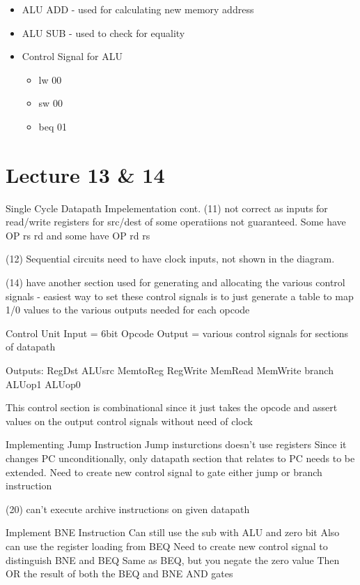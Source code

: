 \documentclass{article}
\begin{document}
		\begin{itemize}
			\item ALU ADD - used for calculating new memory address
			\item ALU SUB - used to check for equality
			\item Control Signal for ALU
			\begin{itemize}
				\item lw 00
				\item sw 00
				\item beq 01
			\end{itemize}
		\end{itemize}
		
\section{Lecture 13 \& 14}
	Single Cycle Datapath Impelementation cont.
		(11) not correct as inputs for read/write registers for src/dest of some operatiions not guaranteed. Some have OP rs rd and some have OP rd rs

		(12) Sequential circuits need to have clock inputs, not shown in the diagram.

		(14) have another section used for generating and allocating the various control signals
		- easiest way to set these control signals is to just generate a table to map 1/0 values to the various outputs needed for each opcode

		Control Unit
			Input = 6bit Opcode
			Output = various control signals for sections of datapath

			Outputs:
				RegDst
				ALUsrc
				MemtoReg
				RegWrite
				MemRead
				MemWrite
				branch
				ALUop1
				ALUop0

			This control section is combinational since it just takes the opcode and assert values on the output control signals without need of clock

		Implementing Jump Instruction
			Jump insturctions doesn't use registers
			Since it changes PC unconditionally, only datapath section that relates to PC needs to be extended. 
			Need to create new control signal to gate either jump or branch instruction

		(20) can't execute archive instructions on given datapath 

		Implement BNE Instruction
			Can still use the sub with ALU and zero bit
			Also can use the register loading from BEQ
			Need to create new control signal to distinguish BNE and BEQ
				Same as BEQ, but you negate the zero value
			Then OR the result  of both the BEQ and BNE AND gates
\end{document}
